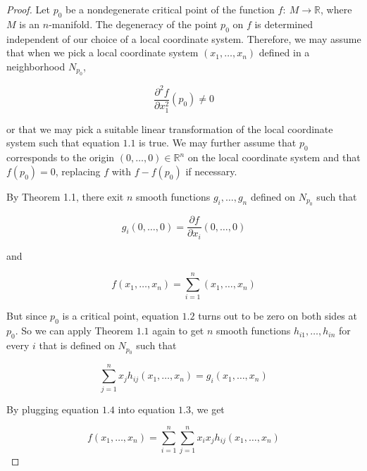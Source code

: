 \documentclass[]{article}
\begin{document}
\begin{proof}
     Let $p_0$ be a nondegenerate critical point of the function
     $f:\ M \to \mathbb{R}$, where $M$ is an $n$-manifold. The degeneracy of the point
     $p_0$ on $f$ is determined independent of our choice of a local coordinate system.
     Therefore, we may assume that when we pick a local coordinate system $(x_1,\ldots,x_n)$ defined
     in a neighborhood $N_{p_0}$,

     \begin{equation}
        \frac{\partial^2f}{\partial x_1^2}(p_0)\not = 0\tag{1.1}
     \end{equation}

    or that we may pick a suitable linear transformation of the local coordinate
    system such that equation $1.1$ is true. We may further assume that $p_0$ corresponds
    to the origin $(0,\ldots,0)\in \mathbb{R}^n$ on the local coordinate system and that $f(p_0)=0$,
    replacing $f$ with $f-f(p_0)$ if necessary.
    
    By Theorem 1.1, there exit $n$ smooth functions $g_i,\ldots,g_n$ defined on
    $N_{p_0}$ such that

     \begin{equation}
        g_i(0,\ldots,0)=\frac{\partial f}{\partial x_i}(0,\ldots,0) \tag{1.2}
     \end{equation}

     and

     \begin{equation}
        f(x_1,\ldots,x_n)=\sum_{i=1}^{n}{(x_1,\ldots,x_n)}\tag{1.3} 
     \end{equation}

     But since $p_0$ is a critical point, equation $1.2$ turns out to be zero on both 
     sides at $p_0$. So we can apply Theorem $1.1$ again to get $n$ smooth functions 
     $h_{i1},\ldots,h_{in}$ for every $i$ that is defined on $N_{p_0}$ such that

     \begin{equation}
        \sum_{j=1}^{n}{x_jh_{ij}(x_1,\ldots,x_n)}=g_i(x_1,\ldots,x_n) \tag{1.4}
     \end{equation}

     By plugging equation $1.4$ into equation $1.3$, we get

     \begin{equation}
        f(x_1,\ldots,x_n)=\sum_{i=1}^{n}\sum_{j=1}^{n}{x_ix_jh_{ij}(x_1,\ldots,x_n)} \tag{1.5}
     \end{equation}


\end{proof}
\end{document}
